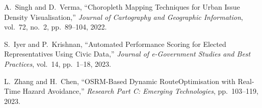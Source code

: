 \documentclass[12pt,a4paper]{report}
\begin{document}
\begin{enumerate}[label={[\arabic*]}, leftmargin=2.5em, itemsep=6pt]
\item A.~Singh and D.~Verma, ``Choropleth Mapping Techniques for Urban
Issue Density Visualisation,'' \textit{Journal of Cartography and
Geographic Information}, vol.~72, no.~2, pp.~89--104, 2022.

\item S.~Iyer and P.~Krishnan, ``Automated Performance Scoring for
Elected Representatives Using Civic Data,'' \textit{Journal of
e-Government Studies and Best Practices}, vol.~14, pp.~1--18, 2023.

\item L.~Zhang and H.~Chen, ``OSRM-Based Dynamic RouteOptimisation with
Real-Time Hazard Avoidance,'' \textit{Research Part C:
Emerging Technologies}, pp.~103--119, 2023.

\end{enumerate}
\end{document}
